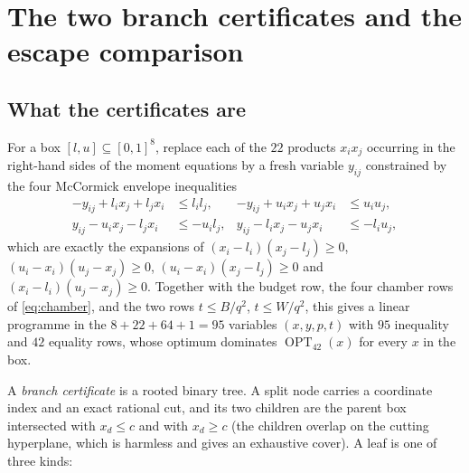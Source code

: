 \documentclass[11pt]{amsart}
\theoremstyle{definition}
\theoremstyle{remark}
\newcommand{\OPT}{\operatorname{OPT}_{42}}
\begin{document}
\section{The two branch certificates and the escape comparison}\label{sec:cert}

\subsection{What the certificates are}

For a box $[l,u]\subseteq[0,1]^8$, replace each of the $22$ products $x_ix_j$ occurring in the right-hand sides of the moment equations by a fresh variable $y_{ij}$ constrained by the four McCormick envelope inequalities
\begin{equation}\label{eq:mccormick}
\begin{aligned}
-y_{ij}+l_ix_j+l_jx_i&\le l_il_j, & -y_{ij}+u_ix_j+u_jx_i&\le u_iu_j,\\
y_{ij}-u_ix_j-l_jx_i&\le-u_il_j, & y_{ij}-l_ix_j-u_jx_i&\le-l_iu_j,
\end{aligned}
\end{equation}
which are exactly the expansions of $(x_i-l_i)(x_j-l_j)\ge0$, $(u_i-x_i)(u_j-x_j)\ge0$, $(u_i-x_i)(x_j-l_j)\ge0$ and $(x_i-l_i)(u_j-x_j)\ge0$. Together with the budget row, the four chamber rows of \eqref{eq:chamber}, and the two rows $t\le B/q^2$, $t\le W/q^2$, this gives a linear programme in the $8+22+64+1=95$ variables $(x,y,p,t)$ with $95$ inequality and $42$ equality rows, whose optimum dominates $\OPT(x)$ for every $x$ in the box.

A \emph{branch certificate} is a rooted binary tree. A split node carries a coordinate index and an exact rational cut, and its two children are the parent box intersected with $x_d\le c$ and with $x_d\ge c$ (the children overlap on the cutting hyperplane, which is harmless and gives an exhaustive cover). A leaf is one of three kinds:
\end{document}
